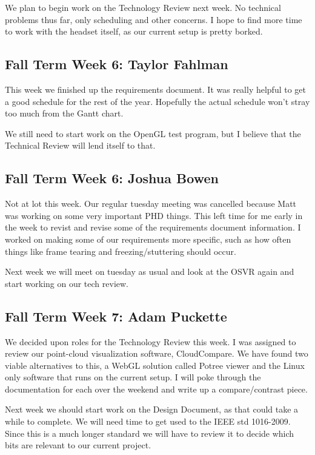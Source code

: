 \documentclass[draftclsnofoot,onecolumn]{IEEEtran}
\begin{document}
We plan to begin work on the Technology Review next week. No technical problems thus far, only scheduling and other concerns. I hope to find more time to work with the headset itself, as our current setup is pretty borked.

\subsection{Fall Term Week 6: Taylor Fahlman}

This week we finished up the requirements document. It was really helpful to get a good schedule for the rest of the year. Hopefully the actual schedule won't stray too much from the Gantt chart.

We still need to start work on the OpenGL test program, but I believe that the Technical Review will lend itself to that.

\subsection{Fall Term Week 6: Joshua Bowen}

Not at lot this week. Our regular tuesday meeting was cancelled because Matt was working on some very important PHD things. This left time for me early in the week to revist and revise some of the requirements document information. I worked on making some of our requirements more specific, such as how often things like frame tearing and freezing/stuttering should occur.

Next week we will meet on tuesday as usual and look at the OSVR again and start working on our tech review.

\subsection{Fall Term Week 7: Adam Puckette}

We decided upon roles for the Technology Review this week. I was assigned to review our point-cloud visualization software, CloudCompare. We have found two viable alternatives to this, a WebGL solution called Potree viewer and the Linux only software that runs on the current setup. I will poke through the documentation for each over the weekend and write up a compare/contrast piece.

Next week we should start work on the Design Document, as that could take a while to complete. We will need time to get used to the IEEE std 1016-2009. Since this is a much longer standard we will have to review it to decide which bits are relevant to our current project.
\end{document}
